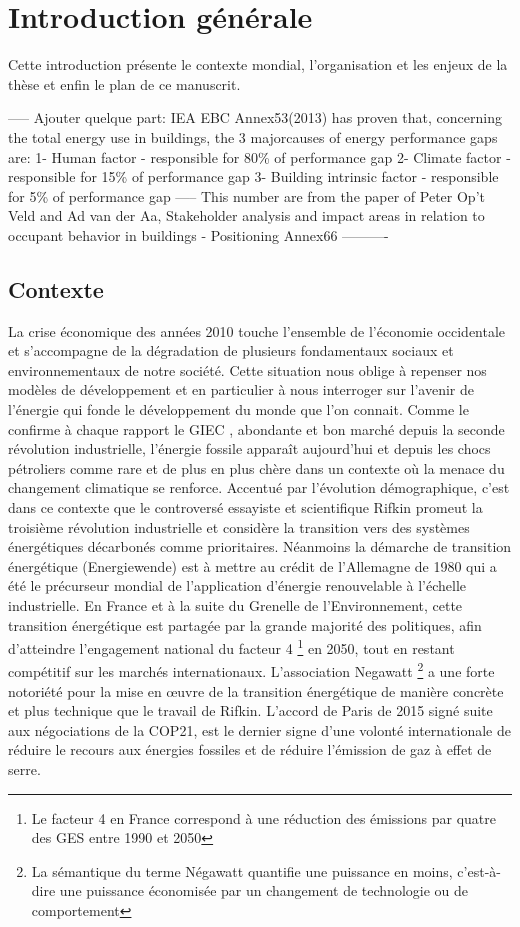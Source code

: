 \chapter*{Introduction générale}

Cette introduction présente le contexte mondial, l'organisation et les enjeux de la thèse et enfin le plan de ce manuscrit.

----- Ajouter quelque part: IEA EBC Annex53(2013) has proven that, concerning the total energy use in buildings, the 3 majorcauses of energy performance gaps are:
1- Human factor - responsible for 80\% of performance gap
2- Climate factor - responsible for 15\% of performance gap
3- Building intrinsic factor -  responsible for 5\% of performance gap
----- This number are from the paper of Peter Op't Veld and Ad van der Aa, Stakeholder analysis and impact areas in relation to occupant behavior in buildings - Positioning Annex66 ----------

\section*{Contexte}

La crise économique des années 2010 touche l'ensemble de l'économie occidentale et s'accompagne de la dégradation de plusieurs fondamentaux sociaux et environnementaux de notre société. Cette situation nous oblige à repenser nos modèles de développement et en particulier à nous interroger sur l'avenir de l'énergie qui fonde le développement du monde que l'on connait. Comme le confirme à chaque rapport le GIEC \cite{GIEC-14}, abondante et bon marché depuis la seconde révolution industrielle, l'énergie fossile apparaît aujourd'hui et depuis les chocs pétroliers comme rare et de plus en plus chère dans un contexte où la menace du changement climatique se renforce. Accentué par l'évolution démographique, c'est dans ce contexte que le controversé essayiste et scientifique Rifkin \cite{Rifkin-12} promeut la troisième révolution industrielle et considère la transition vers des systèmes énergétiques décarbonés comme prioritaires. Néanmoins la démarche de transition énergétique (Energiewende) est à mettre au crédit de l'Allemagne de 1980 qui a été le précurseur mondial de l'application d'énergie renouvelable à l'échelle industrielle. En France et à la suite du Grenelle de l'Environnement, cette transition énergétique est partagée par la grande majorité des politiques, afin d'atteindre l'engagement national du facteur 4 \footnote{Le facteur 4 en France correspond à une réduction des émissions par quatre des GES entre 1990 et 2050} en 2050, tout en restant compétitif sur les marchés internationaux. L'association Negawatt \footnote{La sémantique du terme Négawatt quantifie une puissance en moins, c'est-à-dire une puissance économisée par un changement de technologie ou de comportement} a une forte notoriété pour la mise en œuvre de la transition énergétique de manière concrète et plus technique que le travail de Rifkin. L'accord de Paris de 2015 signé suite aux négociations de la COP21, est le dernier signe d'une volonté internationale de réduire le recours aux énergies fossiles et de réduire l'émission de gaz à effet de serre.

